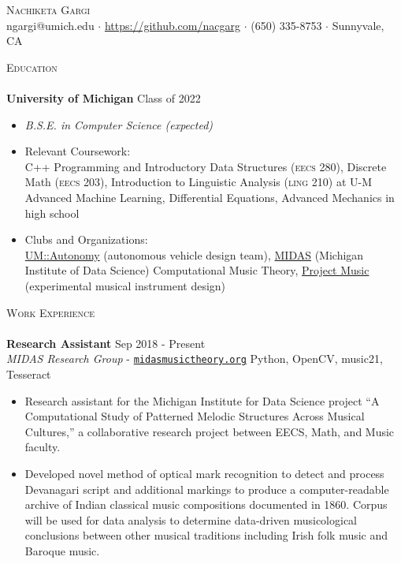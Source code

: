 \documentclass[11pt]{extarticle}
\newcommand{\lineunder} {
	\vspace*{-8pt} \\
	\hspace*{-18pt} \hrulefill \\
}
\newcommand{\header} [1] {
	{\hspace*{-18pt}\vspace*{6pt} \textsc{#1}}
	\vspace*{-6pt} \lineunder
}
\begin{document}
\vspace*{-30pt}
	

\begin{center}
	{\Huge \scshape {Nachiketa Gargi}}\\
	ngargi@umich.edu $\cdot$ \url{https://github.com/nacgarg} $\cdot$ (650) 335-8753 $\cdot$ Sunnyvale, CA \\
\end{center}
\noindent
\header{Education}
\noindent
\textbf{University of Michigan} \hfill Class of 2022
\vspace{-2mm}
\begin{itemize}
	\setlength{\itemindent}{-3mm}
	\item[] \textit{B.S.E. in Computer Science (expected)}\vspace{-3mm}
	\newline
	\vspace{-1mm}

	\item[] Relevant Coursework: \\ C++ Programming and Introductory Data Structures (\textsc{eecs 280}), Discrete Math (\textsc{eecs 203}), Introduction to Linguistic Analysis (\textsc{ling 210}) at U-M \\ Advanced Machine Learning, Differential Equations, Advanced Mechanics in high school
	\item[] Clubs and Organizations:\\ \href{https://umautonomy.com/}{UM::Autonomy} (autonomous vehicle design team), \href{http://www.midasmusictheory.org/}{MIDAS} (Michigan Institute of Data Science) Computational Music Theory, \href{https://michiganprojectmusic.github.io/index.html}{Project Music} (experimental musical instrument design) 
\end{itemize}

\noindent
\header{Work Experience}
\noindent
\textbf{Research Assistant} \hfill Sep 2018 - Present\\
\textit{MIDAS Research Group} - \href{https://midasmusictheory.org}{\texttt{midasmusictheory.org}} \hfill Python, OpenCV, music21, Tesseract\\
\vspace{-6mm}
\begin{itemize} \itemsep 0.1pt
	\item Research assistant for the Michigan Institute for Data Science project “A Computational Study of Patterned Melodic Structures Across Musical Cultures,” a collaborative research project between EECS, Math, and Music faculty.
	\item Developed novel method of optical mark recognition to detect and process Devanagari script and additional markings to produce a computer-readable archive of Indian classical music compositions documented in 1860. Corpus will be used for data analysis to determine data-driven musicological conclusions between other musical traditions including Irish folk music and Baroque music. 
\end{itemize}
\end{document}
